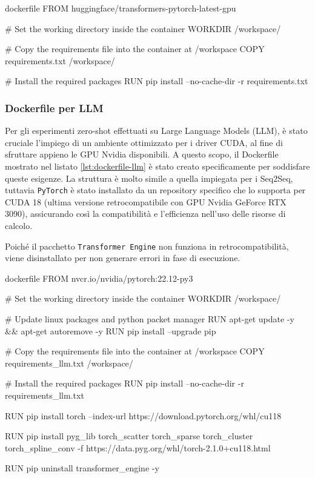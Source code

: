 \documentclass[12pt,a4paper,twoside,openright]{book}
\begin{document}
\begin{customcode}
\begin{mintedbox}{dockerfile}
FROM huggingface/transformers-pytorch-latest-gpu

# Set the working directory inside the container
WORKDIR /workspace/

# Copy the requirements file into the container at /workspace
COPY requirements.txt /workspace/

# Install the required packages
RUN pip install --no-cache-dir -r requirements.txt
\end{mintedbox}
\caption{Dockerfile per Baseline Seq2Seq.}
\label{lst:dockerfile-seq2seq}
\end{customcode}

\subsubsection{Dockerfile per LLM}
Per gli esperimenti zero-shot effettuati su Large Language Models (LLM), è stato cruciale l'impiego di un ambiente ottimizzato per i driver CUDA, al fine di sfruttare appieno le GPU Nvidia disponibili. A questo scopo, il Dockerfile mostrato nel listato \ref{lst:dockerfile-llm} è stato creato specificamente per soddisfare queste esigenze. 
La struttura è molto simile a quella impiegata per i Seq2Seq, tuttavia \texttt{PyTorch} è stato installato da un repository specifico che lo supporta per CUDA 18 (ultima versione retrocompatibile con GPU Nvidia GeForce RTX 3090), assicurando così la compatibilità e l'efficienza nell'uso delle risorse di calcolo.

Poiché il pacchetto \texttt{Transformer Engine} non funziona in retrocompatibilità, viene disinstallato per non generare errori in fase di esecuzione. 

\begin{customcode}
\begin{mintedbox}{dockerfile}
FROM nvcr.io/nvidia/pytorch:22.12-py3

# Set the working directory inside the container
WORKDIR /workspace/

# Update linux packages and python packet manager
RUN apt-get update -y && apt-get autoremove -y
RUN pip install --upgrade pip

# Copy the requirements file into the container at /workspace
COPY requirements_llm.txt /workspace/

# Install the required packages
RUN pip install --no-cache-dir -r requirements_llm.txt

RUN pip install torch --index-url https://download.pytorch.org/whl/cu118

RUN pip install pyg_lib torch_scatter torch_sparse torch_cluster torch_spline_conv -f https://data.pyg.org/whl/torch-2.1.0+cu118.html

RUN pip uninstall transformer_engine -y
\end{mintedbox}
\caption{Dockerfile per LLM.}
\label{lst:dockerfile-llm}
\end{customcode}
\end{document}
